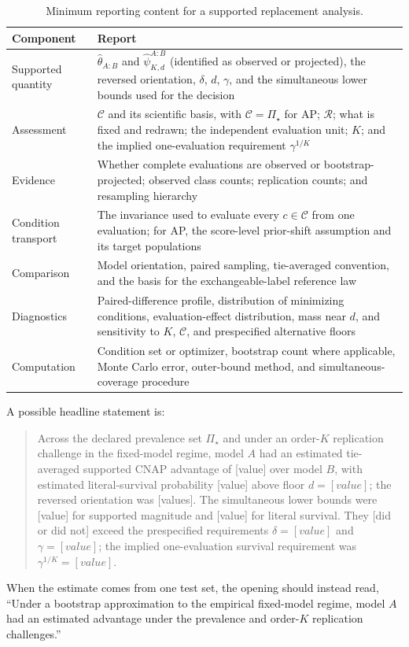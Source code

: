 \documentclass[11pt]{article}
\newcommand{\Regime}{\mathcal{R}}
\newcommand{\CSet}{\mathcal{C}}
\newcommand{\PSet}{\Pi_\star}
\theoremstyle{remark}
\begin{document}
\begin{table}[ht]
\centering
\caption{Minimum reporting content for a supported replacement analysis.}
\label{tab:reporting}
\begin{tabularx}{\textwidth}{@{}p{}X@{}}
\toprule
Component & Report \\
\midrule
Supported quantity &
$\widehat\theta_{A:B}$ and $\widehat\psi^{A:B}_{K,d}$ (identified as observed or projected), the reversed orientation, $\delta$, $d$, $\gamma$, and the simultaneous lower bounds used for the decision \\
Assessment &
$\CSet$ and its scientific basis, with $\CSet=\PSet$ for AP; $\Regime$; what is fixed and redrawn; the independent evaluation unit; $K$; and the implied one-evaluation requirement $\gamma^{1/K}$ \\
Evidence &
Whether complete evaluations are observed or bootstrap-projected; observed class counts; replication counts; and resampling hierarchy \\
Condition transport &
The invariance used to evaluate every $c\in\CSet$ from one evaluation; for AP, the score-level prior-shift assumption and its target populations \\
Comparison &
Model orientation, paired sampling, tie-averaged convention, and the basis for the exchangeable-label reference law \\
Diagnostics &
Paired-difference profile, distribution of minimizing conditions, evaluation-effect distribution, mass near $d$, and sensitivity to $K$, $\CSet$, and prespecified alternative floors \\
Computation &
Condition set or optimizer, bootstrap count where applicable, Monte Carlo error, outer-bound method, and simultaneous-coverage procedure \\
\bottomrule
\end{tabularx}
\end{table}

A possible headline statement is:
\begin{quote}
Across the declared prevalence set $\PSet$ and under an order-$K$ replication challenge in the fixed-model regime, model $A$ had an estimated tie-averaged supported CNAP advantage of [value] over model $B$, with estimated literal-survival probability [value] above floor $d=[value]$; the reversed orientation was [values]. The simultaneous lower bounds were [value] for supported magnitude and [value] for literal survival. They [did or did not] exceed the prespecified requirements $\delta=[value]$ and $\gamma=[value]$; the implied one-evaluation survival requirement was $\gamma^{1/K}=[value]$.
\end{quote}
When the estimate comes from one test set, the opening should instead read, ``Under a bootstrap approximation to the empirical fixed-model regime, model $A$ had an estimated advantage under the prevalence and order-$K$ replication challenges.''
\end{document}
